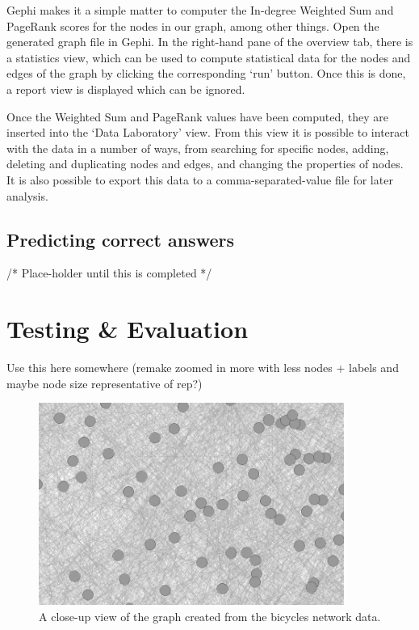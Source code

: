 \documentclass[]{final_report}
\begin{document}
Gephi makes it a simple matter to computer the In-degree Weighted Sum and PageRank scores for the nodes in our graph, among other things. Open the generated graph file in Gephi. In the right-hand pane of the overview tab, there is a statistics view, which can be used to compute statistical data for the nodes and edges of the graph by clicking the corresponding `run' button. Once this is done, a report view is displayed which can be ignored.


Once the Weighted Sum and PageRank values have been computed, they are inserted into the `Data Laboratory' view. From this view it is possible to interact with the data in a number of ways, from searching for specific nodes, adding, deleting and duplicating nodes and edges, and changing the properties of nodes. It is also possible to export this data to a comma-separated-value file for later analysis.


\section{Predicting correct answers}

/* Place-holder until this is completed */

\chapter{Testing \& Evaluation}

Use this here somewhere (remake zoomed in more with less nodes + labels and maybe node size representative of rep?)
\begin{figure}[ht!]
\centering
\includegraphics[width=100mm]{chap4/gephigraph.png}
\caption{A close-up view of the graph created from the bicycles network data.}
\end{figure}\label{gra:network}
\end{document}
